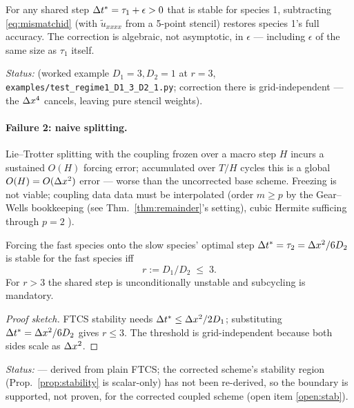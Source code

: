 \begin{theorem}\label{thm:mismatch}
For any shared step $\Delta t^\ast = \tau_1 + \epsilon > 0$ that is stable for
species 1, subtracting \eqref{eq:mismatchid} (with $\tilde u_{xxxx}$ from a
5-point stencil) restores species 1's full accuracy. The correction is
algebraic, not asymptotic, in $\epsilon$ --- including $\epsilon$ of the same
size as $\tau_1$ itself.
\end{theorem}
\noindent\emph{Status:} \tagV (worked example $D_1=3, D_2=1$ at $r=3$,
\texttt{examples/test\_regime1\_D1\_3\_D2\_1.py}; correction there is
grid-independent --- the $\Delta x^4$ cancels, leaving pure stencil weights).

\paragraph{Failure 2: naive splitting.} Lie--Trotter splitting with the
coupling frozen over a macro step $H$ incurs a sustained $O(H)$ forcing error;
accumulated over $T/H$ cycles this is a global $O(H) = O(\Delta x^2)$ error ---
worse than the uncorrected base scheme. Freezing is not viable; coupling data
data must be interpolated (order $m \ge p$ by the Gear--Wells bookkeeping
(see Thm.~\ref{thm:remainder}'s setting), cubic Hermite sufficing through
$p=2$ \citep{gear1984,fok2010}).

\begin{theorem}\label{thm:regime}
Forcing the fast species onto the slow species' optimal step
$\Delta t^\ast=\tau_2=\Delta x^2/6D_2$ is stable for the fast species iff
\[
r := D_1/D_2 \;\le\; 3 .
\]
For $r>3$ the shared step is unconditionally unstable and subcycling is
mandatory.
\end{theorem}
\begin{proof}[Proof sketch]
FTCS stability needs $\Delta t^\ast \le \Delta x^2/2D_1$; substituting
$\Delta t^\ast = \Delta x^2/6D_2$ gives $r\le3$. The threshold is grid-independent
because both sides scale as $\Delta x^2$.
\end{proof}
\noindent\emph{Status:} \tagS --- derived from plain FTCS; the corrected
scheme's stability region (Prop.~\ref{prop:stability} is scalar-only) has not
been re-derived, so the boundary is supported, not proven, for the corrected
coupled scheme (open item \ref{open:stab}).

